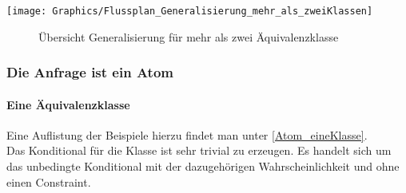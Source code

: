 \documentclass[a4paper, 11pt]{book}
\begin{document}
\texttt{[image: Graphics/Flussplan\_Generalisierung\_mehr\_als\_zweiKlassen]}
\begin{figure}[h]
	\caption{Übersicht Generalisierung für mehr als zwei Äquivalenzklasse}
	\label{Fig_Mehr_Klassen}
\end{figure}
\subsubsection {Die Anfrage ist ein Atom} 
\paragraph{ Eine Äquivalenzklasse}
Eine Auflistung der Beispiele hierzu findet man unter \ref{Atom_eineKlasse}.\\
Das Konditional für die Klasse ist sehr trivial zu erzeugen. Es handelt sich um das unbedingte Konditional mit der dazugehörigen Wahrscheinlichkeit und ohne einen Constraint.
\end{document}
